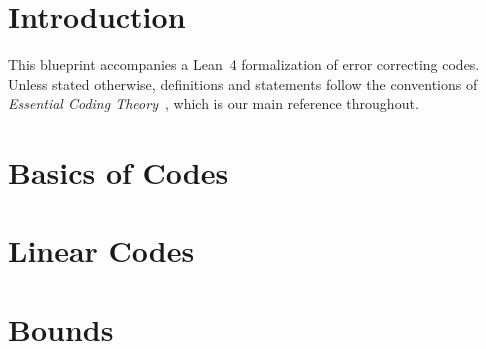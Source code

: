 %
\chapter{Introduction}

This blueprint accompanies a Lean~4 formalization of error correcting codes.
Unless stated otherwise, definitions and statements follow the conventions of
\emph{Essential Coding Theory}~\cite{GRS}, which is our main reference throughout.

\chapter{Basics of Codes}


\chapter{Linear Codes}


\chapter{Bounds}

